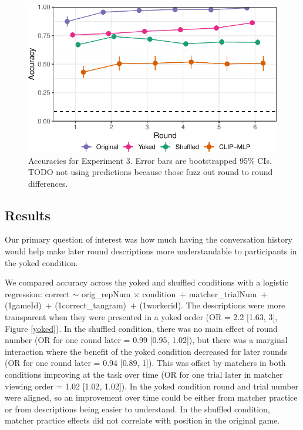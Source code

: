 \documentclass[10pt, letterpaper]{article}
\begin{document}
\begin{CodeChunk}
\begin{figure}[t]

{\centering \includegraphics[width=0.9\linewidth]{figs/fig-yoked-1} 

}

\caption[Accuracies for Experiment 3]{Accuracies for Experiment 3. Error bars are bootstrapped 95\% CIs. TODO not using predictions because those fuzz out round to round differences. \label{yoked}}\label{fig:fig-yoked}
\end{figure}
\end{CodeChunk}

\subsection{Results}\label{results-2}

Our primary question of interest was how much having the conversation
history would help make later round descriptions more understandable to
participants in the yoked condition.

We compared accuracy across the yoked and shuffled conditions with a
logistic regression: correct \({\sim}\) orig\_repNum \({\times}\)
condition~\({+}\) matcher\_trialNum~\({+}\) (1\textbar gameId)~\({+}\)
(1\textbar correct\_tangram)~\({+}\) (1\textbar workerid). The
descriptions were more transparent when they were presented in a yoked
order (OR = 2.2 {[}1.63, 3{]}, Figure \ref{yoked}). In the shuffled
condition, there was no main effect of round number (OR for one round
later = 0.99 {[}0.95, 1.02{]}), but there was a marginal interaction
where the benefit of the yoked condition decreased for later rounds (OR
for one round later = 0.94 {[}0.89, 1{]}). This was offset by matchers
in both conditions improving at the task over time (OR for one trial
later in matcher viewing order = 1.02 {[}1.02, 1.02{]}). In the yoked
condition round and trial number were aligned, so an improvement over
time could be either from matcher practice or from descriptions being
easier to understand. In the shuffled condition, matcher practice
effects did not correlate with position in the original game.
\end{document}

